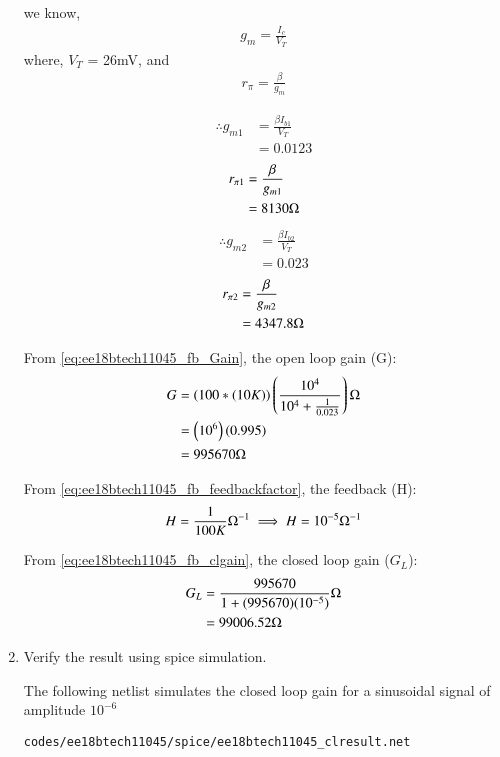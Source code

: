 \begin{enumerate}[label=\arabic*.,ref=\theenumi]
we know, 
\begin{align}
    g_m = \frac{I_{c}}{V_T}
\end{align}
where, $V_T$ = 26mV, and
\begin{align}
    r_{\pi} = \frac{\beta}{g_m}
\end{align}

\begin{align}
    \therefore g_{m1} &= \frac{\beta I_{b1}}{V_T}
    \\
    &= 0.0123
\end{align}
\begin{align}
    r_{\pi 1} &= \frac{\beta}{g_{m1}}
    \\
    &= 8130 \ohm
\end{align}
\begin{align}    
    \therefore g_{m2} &= \frac{\beta I_{b2}}{V_T}
    \\
    &= 0.023
\end{align}
\begin{align}
    r_{\pi 2} &= \frac{\beta}{g_{m2}}
    \\
    &= 4347.8 \ohm
\end{align}

From \eqref{eq:ee18btech11045_fb_Gain}, the open loop gain (G):
\begin{align}
    G &= \left(100*(10K)\right)\left(\frac{10^{4}}{10^{4} + \frac{1}{0.023}}\right) \ohm
    \\
    &= \left(10^{6}\right)\left(0.995\right)
    \\
    &= 995670 \ohm
\end{align}

From \eqref{eq:ee18btech11045_fb_feedbackfactor}, the feedback (H):
\begin{align}
    H = \frac{1}{100K} \ohm^{-1}
    \implies H = 10^{-5} \ohm^{-1}
\end{align}

From \eqref{eq:ee18btech11045_fb_clgain}, the closed loop gain ($G_L$):
\begin{align}
    G_L &= \frac{995670}{1 + (995670)(10^{-5})} \ohm
    \\
    &= 99006.52 \ohm
    \label{eq:ee18btech11045_closedloopgaincl}
\end{align}

\item Verify the result using spice simulation.

\solution

The following netlist simulates the closed loop gain for a sinusoidal signal of amplitude $10^{-6}$
\begin{lstlisting}
codes/ee18btech11045/spice/ee18btech11045_clresult.net
\end{lstlisting}


\end{enumerate}
